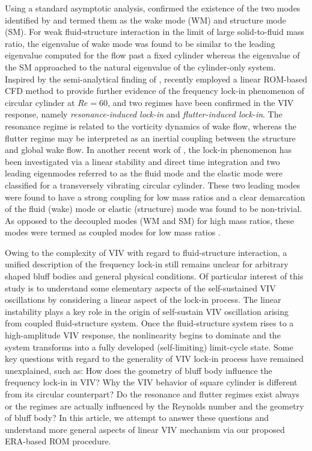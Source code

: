 \documentclass{jfm}
\begin{document}
Using a standard asymptotic analysis, \cite{meliga2011} confirmed the existence of 
the two modes identified by \cite{cossu2000} and termed them as the wake mode (WM) 
and structure mode (SM). For weak fluid-structure interaction in the limit 
of large solid-to-fluid mass ratio, the eigenvalue of wake mode was found to be similar 
to the leading eigenvalue computed for the flow past a fixed cylinder whereas
the eigenvalue of the SM approached to the natural eigenvalue
of the cylinder-only system.
Inspired by the semi-analytical finding of \cite{DeLangre2006},
\cite{Zhang2015} recently employed 
a linear ROM-based CFD method 
to provide further evidence of the frequency lock-in phenomenon 
of circular cylinder at $Re=60$, and two regimes have been confirmed 
in the VIV response, namely \emph{resonance-induced lock-in} and \emph{flutter-induced lock-in}. The 
resonance regime is related to the vorticity dynamics of wake flow, whereas the 
flutter regime may be interpreted as an inertial coupling between 
the structure and global wake flow.
In another recent work of \cite{mittal2016}, the lock-in phenomenon has been 
investigated via a linear stability and direct time integration and two leading 
eigenmodes referred to as the fluid mode and the elastic mode were classified 
for a transversely vibrating circular cylinder. These two leading 
modes were found to have a strong coupling for low mass ratios and a clear 
demarcation of the fluid (wake) mode or elastic (structure) mode was found to be 
non-trivial. As opposed to the decoupled modes (WM and SM) for high mass ratios, 
these modes were termed as coupled modes for low mass ratios \citep{mittal2016}.


Owing to the complexity of VIV with regard to fluid-structure interaction, 
a unified description of the frequency lock-in still remains unclear 
for arbitrary shaped bluff bodies and general physical conditions.
%
Of particular interest of this study is to understand some elementary aspects of the self-sustained VIV oscillations  by considering a linear aspect of the lock-in process. 
The linear instability plays a key role in the origin of self-sustain VIV oscillation arising 
from coupled fluid-structure system. Once the fluid-structure system rises to  
a high-amplitude VIV response, 
the nonlinearity begins to dominate and the system transforms 
into a fully developed (self-limiting) limit-cycle state.
%
Some key questions with regard to the generality of 
VIV lock-in process have remained unexplained, such as:
How does the geometry of bluff body influence the frequency lock-in in VIV? Why the VIV behavior of square cylinder is different from its circular counterpart? 
Do the resonance and flutter regimes exist always or the regimes are actually 
influenced by the Reynolds number and the geometry of bluff body? 
In this article, we attempt to answer these questions 
and understand more general aspects of linear VIV mechanism 
via our proposed ERA-based ROM procedure.     
%
\end{document}
